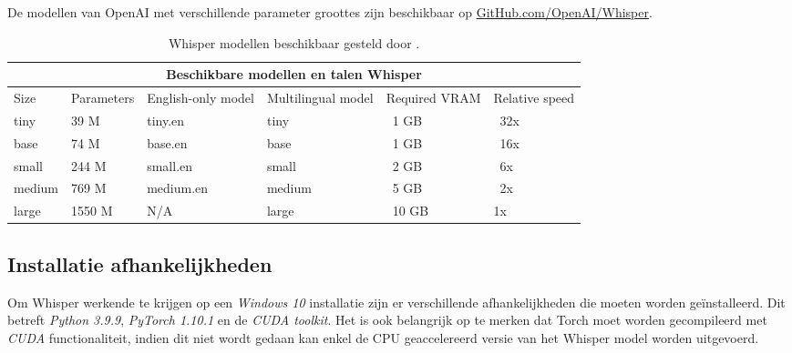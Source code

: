 \bigbreak{}

De modellen van OpenAI met verschillende parameter groottes zijn beschikbaar op \href{https://github.com/openai/whisper}{GitHub.com/OpenAI/Whisper}.

\bigbreak{}

\begin{table}
    \begin{tabular}{ |p{1.5cm}|p{2.5cm}|p{3cm}|p{3cm}|p{2cm}|p{2cm}|  }
        \hline
        \multicolumn{6}{|c|}{Beschikbare modellen en talen Whisper} \\
        \hline
            Size& Parameters & English-only model & Multilingual model & Required VRAM & Relative speed\\
        \hline
            tiny&       39 M    &tiny.en    & tiny& ~1 GB& ~32x     \\
            base &      74 M	&base.en    & base & ~1 GB & ~16x   \\
            small &     244 M	&small.en   & small & ~2 GB & ~6x   \\
            medium &    769 M	&medium.en  & medium & ~5 GB & ~2x  \\
            large &     1550 M	&N/A        & large & ~10 GB& 	1x  \\
        \hline
    \end{tabular}
    \caption{Whisper modellen beschikbaar gesteld door \textcite{OpenAI2023}.}
    \label{tab:OpenAIWhisperModels}
\end{table}

\bigbreak{}

\subsection*{Installatie afhankelijkheden}

Om Whisper werkende te krijgen op een \textit{Windows 10} installatie zijn er verschillende afhankelijkheden die moeten worden geïnstalleerd. Dit betreft \textit{Python 3.9.9}, \textit{PyTorch 1.10.1} en de \textit{CUDA toolkit}. Het is ook belangrijk op te merken dat Torch moet worden gecompileerd met \textit{CUDA} functionaliteit, indien dit niet wordt gedaan kan enkel de CPU geaccelereerd versie van het Whisper model worden uitgevoerd.

\bigbreak{}



